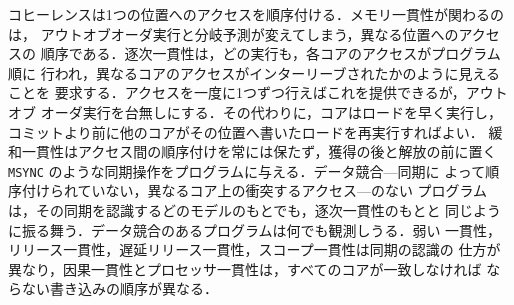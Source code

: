 \documentclass[../main.tex]{subfiles}
\begin{document}
\begin{keypoint}[章のまとめ]
  コヒーレンスは1つの位置へのアクセスを順序付ける．メモリ一貫性が関わるのは，
  アウトオブオーダ実行と分岐予測が変えてしまう，異なる位置へのアクセスの
  順序である．逐次一貫性は，どの実行も，各コアのアクセスがプログラム順に
  行われ，異なるコアのアクセスがインターリーブされたかのように見えることを
  要求する．アクセスを一度に1つずつ行えばこれを提供できるが，アウトオブ
  オーダ実行を台無しにする．その代わりに，コアはロードを早く実行し，
  コミットより前に他のコアがその位置へ書いたロードを再実行すればよい．
  緩和一貫性はアクセス間の順序付けを常には保たず，獲得の後と解放の前に置く
  \texttt{MSYNC} のような同期操作をプログラムに与える．データ競合---同期に
  よって順序付けられていない，異なるコア上の衝突するアクセス---のない
  プログラムは，その同期を認識するどのモデルのもとでも，逐次一貫性のもとと
  同じように振る舞う．データ競合のあるプログラムは何でも観測しうる．弱い
  一貫性，リリース一貫性，遅延リリース一貫性，スコープ一貫性は同期の認識の
  仕方が異なり，因果一貫性とプロセッサ一貫性は，すべてのコアが一致しなければ
  ならない書き込みの順序が異なる．
\end{keypoint}
\end{document}
